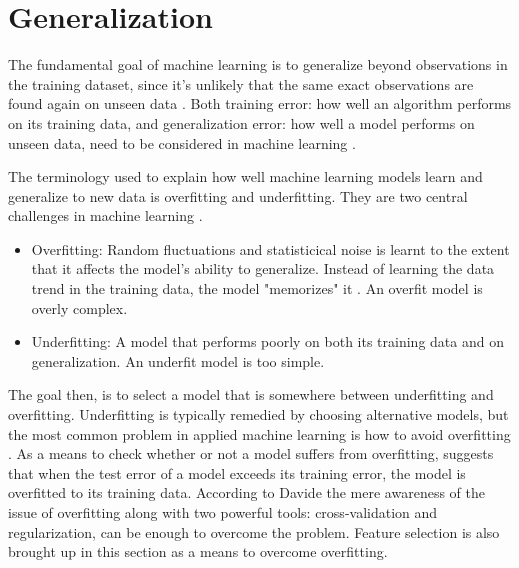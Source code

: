 		
\section{Generalization} \label{sec:generalization}
	The fundamental goal of machine learning is to generalize beyond observations in the training dataset, since it's unlikely that the same exact observations are found again on unseen data \cite{ARTICLE:3}. Both training error: how well an algorithm performs on its training data, and generalization error: how well a model performs on unseen data, need to be considered in machine learning \cite{BOOK:1}.

	The terminology used to explain how well machine learning models learn and generalize to new data is overfitting and underfitting. They are two central challenges in machine learning \cite{BOOK:1}. 
\begin{itemize}
	\item{Overfitting:} Random fluctuations and statisticical noise is learnt to the extent that it affects the model's ability to generalize. Instead of learning the data trend in the training data, the model "memorizes" it \cite{ARTICLE:4}. An overfit model is overly complex.
	\item{Underfitting:} A model that performs poorly on both its training data and on generalization. An underfit model is too simple.
\end{itemize}

	The goal then, is to select a model that is somewhere between underfitting and overfitting. Underfitting is typically remedied by choosing alternative models, but the most common problem in applied machine learning is how to avoid overfitting \cite{WEBSITE:8}. As a means to check whether or not a model suffers from overfitting, \cite{IP:7} suggests that when the test error of a model exceeds its training error, the model is overfitted to its training data. %
According to Davide \cite{ARTICLE:4}  the mere awareness of the issue of overfitting along with two powerful tools: cross-validation and regularization, can be enough to overcome the problem. Feature selection is also brought up in this section as a means to overcome overfitting.

